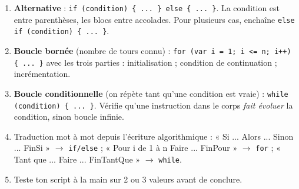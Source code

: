 \documentclass[11pt]{article}
\newcommand{\cle}[1]{{\popxbold\color{popdark}#1}}
\begin{document}
\begin{methode}
\begin{enumerate}
  \item \textbf{Alternative} : \texttt{if (condition) \{ ... \} else \{ ... \}}. La condition est entre \cle{parenthèses}, les blocs entre \cle{accolades}. Pour plusieurs cas, enchaîne \texttt{else if (condition) \{ ... \}}.
  \item \textbf{Boucle bornée} (nombre de tours connu) : \texttt{for (var i = 1; i <= n; i++) \{ ... \}} avec les trois parties : initialisation ; condition de continuation ; incrémentation.
  \item \textbf{Boucle conditionnelle} (on répète tant qu'une condition est vraie) : \texttt{while (condition) \{ ... \}}. Vérifie qu'une instruction dans le corps \emph{fait évoluer} la condition, sinon boucle infinie.
  \item Traduction mot à mot depuis l'écriture algorithmique : « Si ... Alors ... Sinon ... FinSi » $\rightarrow$ \texttt{if/else} ; « Pour i de 1 à n Faire ... FinPour » $\rightarrow$ \texttt{for} ; « Tant que ... Faire ... FinTantQue » $\rightarrow$ \texttt{while}.
  \item Teste ton script à la main sur 2 ou 3 valeurs avant de conclure.
\end{enumerate}
\end{methode}
\end{document}
